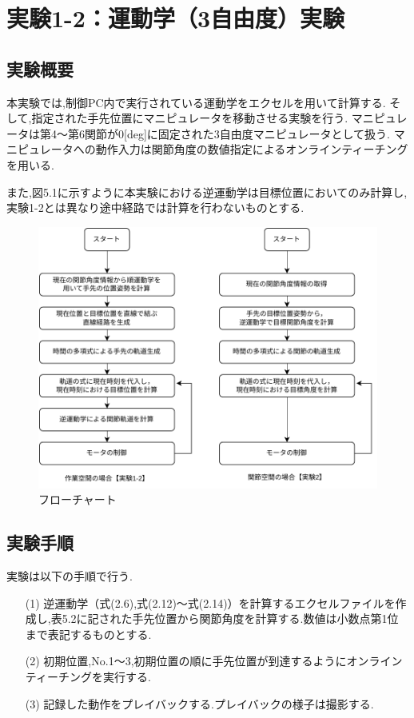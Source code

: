 \section{実験1-2：運動学（3自由度）実験}

\subsection{実験概要}
本実験では,制御PC内で実行されている運動学をエクセルを用いて計算する.
そして,指定された手先位置にマニピュレータを移動させる実験を行う.
マニピュレータは第4～第6関節が0[deg]に固定された3自由度マニピュレータとして扱う.
マニピュレータへの動作入力は関節角度の数値指定によるオンラインティーチングを用いる.

また,図5.1に示すように本実験における逆運動学は目標位置においてのみ計算し,
実験1-2とは異なり途中経路では計算を行わないものとする.

\begin{figure}[h]
  \centering
  \includegraphics[scale=0.75]{sozai/3.pdf}
  \caption{フローチャート}
\end{figure}

\newpage

\subsection{実験手順}
実験は以下の手順で行う.

\begin{enumerate}
  \item[(1)] 逆運動学（式(2.6),式(2.12)～式(2.14)）を計算するエクセルファイルを作成し,表5.2に記された手先位置から関節角度を計算する.数値は小数点第1位まで表記するものとする.
  \item[(2)] 初期位置,No.1～3,初期位置の順に手先位置が到達するようにオンラインティーチングを実行する.
  \item[(3)] 記録した動作をプレイバックする.プレイバックの様子は撮影する.
\end{enumerate}

